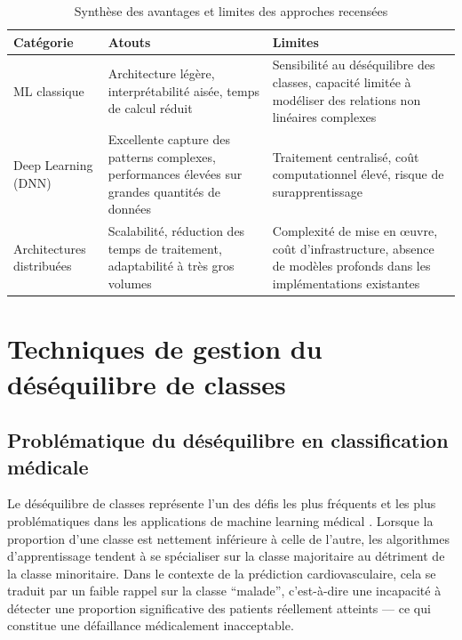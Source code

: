 \documentclass[12pt,a4paper]{report}
\begin{document}
\begin{table}[H]
\centering
\caption{Synthèse des avantages et limites des approches recensées}
\label{tab:avantages_limites}
\begin{tabularx}{\textwidth}{L{3.2cm} X X}
\toprule
\textbf{Catégorie} & \textbf{Atouts} & \textbf{Limites} \\
\midrule
ML classique
  & Architecture légère, interprétabilité aisée, temps de calcul réduit
  & Sensibilité au déséquilibre des classes, capacité limitée à modéliser des relations non linéaires complexes \\
\addlinespace
Deep Learning (DNN)
  & Excellente capture des patterns complexes, performances élevées sur grandes quantités de données
  & Traitement centralisé, coût computationnel élevé, risque de surapprentissage \\
\addlinespace
Architectures distribuées
  & Scalabilité, réduction des temps de traitement, adaptabilité à très gros volumes
  & Complexité de mise en œuvre, coût d'infrastructure, absence de modèles profonds dans les implémentations existantes \\
\bottomrule
\end{tabularx}
\end{table}

\section{Techniques de gestion du déséquilibre de classes}

\subsection{Problématique du déséquilibre en classification médicale}

Le déséquilibre de classes représente l'un des défis les plus fréquents et les plus
problématiques dans les applications de machine learning médical \cite{he2009}.
Lorsque la proportion d'une classe est nettement inférieure à celle de l'autre, les
algorithmes d'apprentissage tendent à se spécialiser sur la classe majoritaire au
détriment de la classe minoritaire. Dans le contexte de la prédiction
cardiovasculaire, cela se traduit par un faible rappel sur la classe
\enquote{malade}, c'est-à-dire une incapacité à détecter une proportion significative
des patients réellement atteints --- ce qui constitue une défaillance médicalement
inacceptable.
\end{document}
